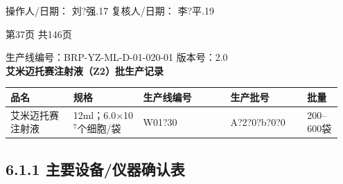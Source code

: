 \documentclass[UTF8,10pt,a4paper,fontset=fandol]{ctexart}
\newcommand{\fieldvalue}[1]{#1}
\newcommand{\handwritten}[1]{#1}
\begin{document}
\noindent
操作人/日期：
\fieldvalue{\handwritten{刘?强.17}}
\hfill
复核人/日期：
\fieldvalue{\handwritten{李?平.19}}

\begin{center}
第37页 共146页
\end{center}

\newpage

\begin{center}
{\small 生产线编号：BRP-YZ-ML-D-01-020-01 \qquad 版本号：2.0}\\
\textbf{艾米迈托赛注射液（Z2）批生产记录}
\end{center}

\begin{center}
\begin{tabular}{|p{0.18\linewidth}|p{0.20\linewidth}|p{0.25\linewidth}|p{0.22\linewidth}|p{0.10\linewidth}|}
\hline
品名 & 规格 & 生产线编号 & 生产批号 & 批量\\
\hline
艾米迈托赛注射液 & 12ml；6.0$\times$10$^{7}$个细胞/袋 &
\fieldvalue{\handwritten{W01?30}} &
\fieldvalue{\handwritten{A?2?0?b?0?0}} &
200--600袋\\
\hline
\end{tabular}
\end{center}

\subsection*{6.1.1 主要设备/仪器确认表}
\end{document}
